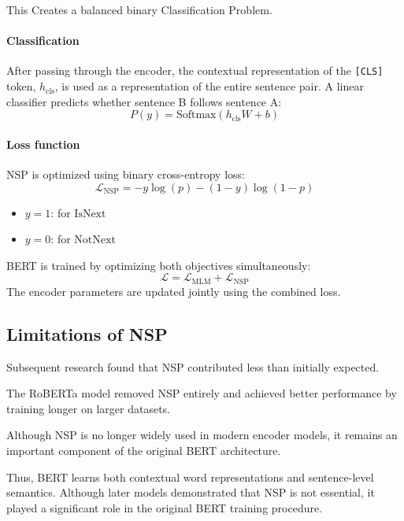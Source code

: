 This Creates a balanced binary Classification Problem.

\paragraph{Classification}
After passing through the encoder, the contextual representation of the \texttt{[CLS]} token, $h_{\text{cls}}$, is used as a representation of the entire sentence pair. A linear classifier predicts whether sentence B follows sentence A:
\begin{equation}
P(y) = \text{Softmax}(h_{\text{cls}} W + b)
\end{equation}

\paragraph{Loss function}
NSP is optimized using binary cross-entropy loss:
\begin{equation}
\mathcal{L}_{\text{NSP}} = -y \log(p) - (1-y) \log(1-p)
\end{equation}
\begin{itemize}
    \item $y=1$: for $\text{IsNext}$
    \item $y=0$: for $\text{NotNext}$
\end{itemize}

BERT is trained by optimizing both objectives simultaneously:
\begin{equation}
\mathcal{L} = \mathcal{L}_{\text{MLM}} + \mathcal{L}_{\text{NSP}}
\end{equation}
The encoder parameters are updated jointly using the combined loss.

\subsection{Limitations of NSP}

Subsequent research found that NSP contributed less than initially expected.

The RoBERTa model removed NSP entirely and achieved better performance by training longer on larger datasets.

Although NSP is no longer widely used in modern encoder models, it remains an important component of the original BERT architecture.

Thus, BERT learns both contextual word representations and sentence-level semantics. Although later models demonstrated that NSP is not essential, it played a significant role in the original BERT training procedure.

